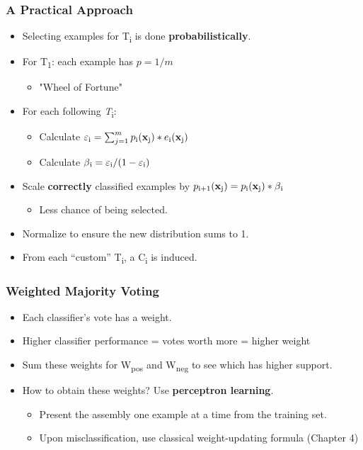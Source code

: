 \documentclass{beamer}
\begin{document}
\begin{frame}
\frametitle{A Practical Approach}
\begin{itemize}
\item Selecting examples for T\textsubscript{i} is done \textbf{probabilistically}. 
\item For T\textsubscript{1}: each example has $p = 1 / m$
\begin{itemize}
\item "Wheel of Fortune" 
\end{itemize}
\item For each following \textit{T}\textsubscript{i}: 
\begin{itemize}
\item Calculate $\varepsilon\textsubscript{i} = \sum_{j=1}^{m} p\textsubscript{i}(\textbf{x}\textsubscript{j}) * e\textsubscript{i}(\textbf{x}\textsubscript{j})$
\item Calculate $\beta\textsubscript{i} = \varepsilon\textsubscript{i} / (1 - \varepsilon\textsubscript{i}) $
\end{itemize}
\item Scale \textbf{correctly} classified examples by $p\textsubscript{i+1}(\textbf{x}\textsubscript{j}) = p\textsubscript{i}(\textbf{x}\textsubscript{j}) * \beta\textsubscript{i}$
\begin{itemize}
\item Less chance of being selected. 
\end{itemize}
\item Normalize to ensure the new distribution sums to 1.  
\item From each ``custom'' T\textsubscript{i}, a C\textsubscript{i} is induced.
\end{itemize}
\end{frame}
\begin{frame}
\frametitle{Weighted Majority Voting}
\begin{itemize}
\item Each classifier's vote has a weight.
\item Higher classifier performance = votes worth more = higher weight
\item Sum these weights for W\textsubscript{pos} and W\textsubscript{neg} to see which has higher support. 
\item How to obtain these weights? Use \textbf{perceptron learning}. 
\begin{itemize}
\item Present the assembly one example at a time from the training set.
\item Upon misclassification, use classical weight-updating formula (Chapter 4)
\end{itemize}
\end{itemize}

\end{frame}
\end{document}
